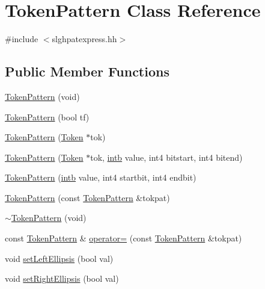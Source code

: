 \hypertarget{class_token_pattern}{}\section{Token\+Pattern Class Reference}
\label{class_token_pattern}


{\ttfamily \#include $<$slghpatexpress.\+hh$>$}

\subsection*{Public Member Functions}
\begin{DoxyCompactItemize}
\item 
\mbox{\hyperlink{class_token_pattern_a81497849725bea3d3a16ca8bc73c7439}{Token\+Pattern}} (void)
\item 
\mbox{\hyperlink{class_token_pattern_ae0798c288cfb9a79be1588db259ce167}{Token\+Pattern}} (bool tf)
\item 
\mbox{\hyperlink{class_token_pattern_aec8888a1d631dd59d84283b33f604f1d}{Token\+Pattern}} (\mbox{\hyperlink{class_token}{Token}} $\ast$tok)
\item 
\mbox{\hyperlink{class_token_pattern_a3f36ba0774ba31996a2d828767f40ee4}{Token\+Pattern}} (\mbox{\hyperlink{class_token}{Token}} $\ast$tok, \mbox{\hyperlink{types_8h_aa925ba3e627c2df89d5b1cfe84fb8572}{intb}} value, int4 bitstart, int4 bitend)
\item 
\mbox{\hyperlink{class_token_pattern_a4b473d0abd3575ba26475aa9de9a7ed6}{Token\+Pattern}} (\mbox{\hyperlink{types_8h_aa925ba3e627c2df89d5b1cfe84fb8572}{intb}} value, int4 startbit, int4 endbit)
\item 
\mbox{\hyperlink{class_token_pattern_ad8e3396b992b61d59d6cb64fba4a7d86}{Token\+Pattern}} (const \mbox{\hyperlink{class_token_pattern}{Token\+Pattern}} \&tokpat)
\item 
\mbox{\hyperlink{class_token_pattern_aafc7a965aab9d0d34a5b35e0f272c735}{$\sim$\+Token\+Pattern}} (void)
\item 
const \mbox{\hyperlink{class_token_pattern}{Token\+Pattern}} \& \mbox{\hyperlink{class_token_pattern_ae92469c4426988e363f1e8dd1f14a6e6}{operator=}} (const \mbox{\hyperlink{class_token_pattern}{Token\+Pattern}} \&tokpat)
\item 
void \mbox{\hyperlink{class_token_pattern_a04ac201bbf0e434339f22808273a02f9}{set\+Left\+Ellipsis}} (bool val)
\item 
void \mbox{\hyperlink{class_token_pattern_a445e515457a5a7b1541f1b2007a0eac4}{set\+Right\+Ellipsis}} (bool val)

\end{DoxyCompactItemize}
